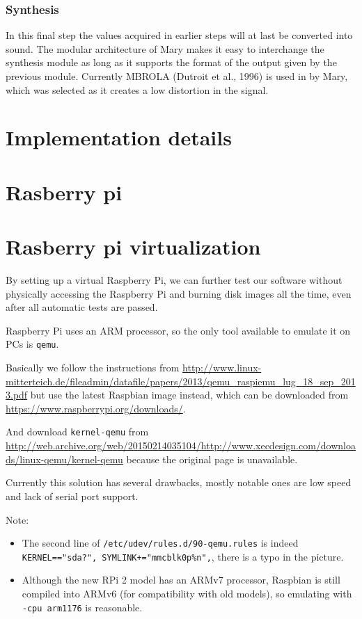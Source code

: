 \documentclass[a4paper, 12pt]{article}
\begin{document}
\subsubsection* {Synthesis}
In this final step the values acquired in earlier steps will at last be converted into sound.
The modular architecture of Mary makes it easy to interchange the synthesis module as long as it supports the format of the output given by the previous module.
Currently MBROLA (Dutroit et al., 1996) is used in by Mary, which was selected as it creates a low distortion in the signal.

\section{Implementation details}
\section{Rasberry pi} 
\section{Rasberry pi virtualization}
By setting up a virtual Raspberry Pi, we can further test our software without physically accessing the Raspberry Pi and burning disk images all the time, even after all automatic tests are passed.


Raspberry Pi uses an ARM processor, so the only tool available to emulate it on PCs is \texttt{qemu}.

Basically we follow the instructions from \url{http://www.linux-mitterteich.de/fileadmin/datafile/papers/2013/qemu_raspiemu_lug_18_sep_2013.pdf} but use the latest Raspbian image instead, which can be downloaded from \url{https://www.raspberrypi.org/downloads/}.

And download \texttt{kernel-qemu} from \url{http://web.archive.org/web/20150214035104/http://www.xecdesign.com/downloads/linux-qemu/kernel-qemu} because the original page is unavailable.

Currently this solution has several drawbacks, mostly notable ones are low speed and lack of serial port support.

\vspace{\baselineskip}

Note:

\begin{itemize}
\item The second line of \texttt{/etc/udev/rules.d/90-qemu.rules} is indeed \texttt{KERNEL=="sda?", SYMLINK+="mmcblk0p\%n",}, there is a typo in the picture.
\item Although the new RPi 2 model has an ARMv7 processor, Raspbian is still compiled into ARMv6 (for compatibility with old models), so emulating with \texttt{-cpu arm1176} is reasonable.
\end{itemize}
\end{document}
